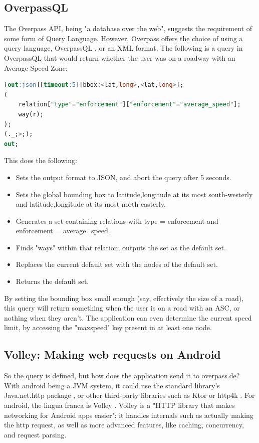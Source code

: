 \documentclass[11pt, a4paper, notitlepage]{report}
\begin{document}
\subsection{OverpassQL}
The Overpass API, being "a database over the web", suggests the requirement of some form of Query Language. However, Overpass offers the choice of using a query language, OverpassQL \citep{overpassQLWiki}, or an XML format. The following is a query in OverpassQL that would return whether the user was on a roadway with an Average Speed Zone:
\begin{lstlisting}[language=SQL]
[out:json][timeout:5][bbox:<lat,long>,<lat,long>];
(
    relation["type"="enforcement"]["enforcement"="average_speed"];
    way(r);
);
(._;>;);
out;
\end{lstlisting}
This does the following:
\begin{itemize}
	\item Sets the output format to JSON, and abort the query after 5 seconds.
	\item Sets the global bounding box to latitude,longitude at its most south-westerly and latitude,longitude at its most north-easterly.
	\item Generates a set containing relations with type = enforcement and enforcement = average\_speed.
	\item Finds "ways" within that relation; outputs the set as the default set.
	\item Replaces the current default set with the nodes of the default set.
	\item Returns the default set.
\end{itemize}
By setting the bounding box small enough (say, effectively the size of a road), this query will return something when the user is on a road with an ASC, or nothing when they aren't. The application can even determine the current speed limit, by accessing the "maxspeed" key present in at least one node.

\subsection{Volley: Making web requests on Android}
So the query is defined, but how does the application send it to overpass.de? With android being a JVM system, it could use the standard library's Java.net.http package \citep{javanethttp}, or other third-party libraries such as Ktor \citep{ktor} or http4k \citep{http4k}. For android, the lingua franca is Volley \citep{volley}. Volley is a "HTTP library that makes networking for Android apps easier"; it handles internals such as actually making the http request, as well as more advanced features, like caching, concurrency, and request parsing.
\end{document}
